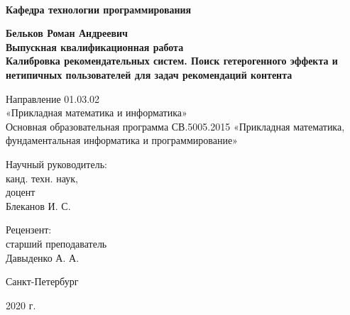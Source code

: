 
\begin{titlepage}
\begin{center}
\\
\textbf{Кафедра технологии программирования}

\vspace{22mm}

\textbf{\Large Бельков Роман Андреевич} \\[7mm]
\textbf{\large Выпускная квалификационная работа}\\[12mm]
\textbf{\Large Калибровка рекомендательных систем. Поиск гетерогенного эффекта и нетипичных пользователей для задач рекомендаций контента}

\vspace{12mm}
Направление 01.03.02 \\«Прикладная математика и информатика»\\
Основная образовательная программа СВ.5005.2015
«Прикладная математика, фундаментальная информатика и программирование»\\

\vspace{18mm}

\begin{flushleft}
{\setlength{\leftskip}{23em}
 {Научный руководитель:} \\
 канд. техн. наук, \\
 доцент \\ Блеканов И. С. \\
}
\end{flushleft}
\begin{flushleft}
    \setlength{\leftskip}{23em}
    {Рецензент:} \\
    старший преподаватель \\ Давыденко А. А.
    \end{flushleft}
\vfill

{Санкт-Петербург}
\par{2020 г.}
\end{center}
\end{titlepage}
\restoregeometry
\addtocounter{page}{1}